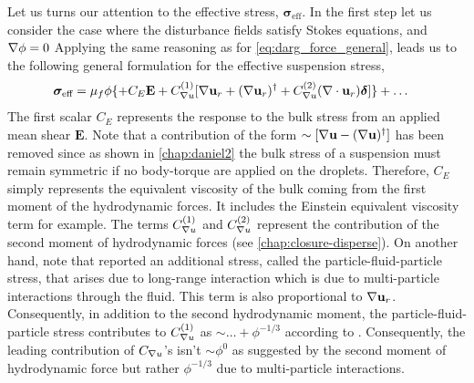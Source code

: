 Let us turns our attention to the effective stress, $\bm\sigma_\text{eff}$. 
In the first step let us consider the case where the disturbance fields satisfy Stokes equations, and $\mathbf{\nabla} \phi = 0$ 
Applying the same reasoning as for \ref{eq:darg_force_general}, leads us to the following general formulation for the effective suspension stress,  
\begin{align}
    \bm\sigma_\text{eff} &= 
    \mu_f \phi 
    \{ 
    + C_E  \textbf{E}
    +  C_{\grad u}^{(1)} [\grad \textbf{u}_{r} +(\grad \textbf{u}_{r})^\dagger + C_{\grad u}^{(2)}(\div  \textbf{u}_{r})\bm\delta] \}
    + \ldots
    \label{eq:stress_stokes}
\end{align}
The first scalar $C_E$ represents the response to the bulk stress from an applied mean shear $\textbf{E}$. 
Note that a contribution of the form $\sim[\mathbf{\nabla} \textbf{u}-(\mathbf{\nabla} \textbf{u})^\dagger]$ has been removed since as shown in \ref{chap:daniel2} the bulk stress of a suspension must remain symmetric if no body-torque are applied on the droplets. 
Therefore, $C_E$ simply represents the equivalent viscosity of the bulk coming from the first moment of the hydrodynamic forces.
It includes the Einstein equivalent viscosity term for example. 
The terms $C_{\mathbf{\nabla} u}^{(1)}$ and $C_{\mathbf{\nabla} u}^{(2)}$ represent the contribution of the second moment of hydrodynamic forces (see \ref{chap:closure-disperse}). 
On another hand, note that \citet{zhang2021stress} reported an additional stress, called the particle-fluid-particle stress, that arises due to long-range interaction which is due to multi-particle interactions through the fluid. 
This term is also proportional to $\mathbf{\nabla} \textbf{u}_{r}$. 
Consequently, in addition to the second hydrodynamic moment, the particle-fluid-particle stress contributes to $C_{\mathbf{\nabla} u}^{(1)}$ as $\sim \ldots+ \phi^{-1/3}$ according to \citep{zhang2021stress}. 
Consequently, the leading contribution of $C_{\mathbf{\nabla} u}$'s isn't $\sim \phi^0$ as suggested by the second moment of hydrodynamic force but rather $\phi^{-1/3}$ due to multi-particle interactions. 


